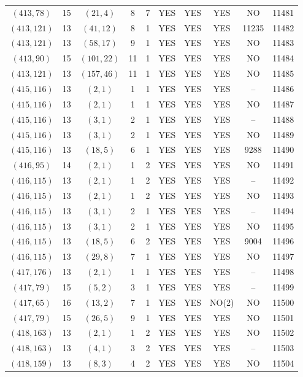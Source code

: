 \begin{longtable}{|c|c|c|c|c|c|c|c|c|c|}
$(413, 78)$ & 15 & $(21, 4)$ & 8 & 7 & YES & YES & YES & NO & 11481\\
$(413, 121)$ & 13 & $(41, 12)$ & 8 & 1 & YES & YES & YES & 11235 & 11482\\
$(413, 121)$ & 13 & $(58, 17)$ & 9 & 1 & YES & YES & YES & NO & 11483\\
$(413, 90)$ & 15 & $(101, 22)$ & 11 & 1 & YES & YES & YES & NO & 11484\\
$(413, 121)$ & 13 & $(157, 46)$ & 11 & 1 & YES & YES & YES & NO & 11485\\
$(415, 116)$ & 13 & $(2, 1)$ & 1 & 1 & YES & YES & YES & -- & 11486\\
$(415, 116)$ & 13 & $(2, 1)$ & 1 & 1 & YES & YES & YES & NO & 11487\\
$(415, 116)$ & 13 & $(3, 1)$ & 2 & 1 & YES & YES & YES & -- & 11488\\
$(415, 116)$ & 13 & $(3, 1)$ & 2 & 1 & YES & YES & YES & NO & 11489\\
$(415, 116)$ & 13 & $(18, 5)$ & 6 & 1 & YES & YES & YES & 9288 & 11490\\
$(416, 95)$ & 14 & $(2, 1)$ & 1 & 2 & YES & YES & YES & NO & 11491\\
$(416, 115)$ & 13 & $(2, 1)$ & 1 & 2 & YES & YES & YES & -- & 11492\\
$(416, 115)$ & 13 & $(2, 1)$ & 1 & 2 & YES & YES & YES & NO & 11493\\
$(416, 115)$ & 13 & $(3, 1)$ & 2 & 1 & YES & YES & YES & -- & 11494\\
$(416, 115)$ & 13 & $(3, 1)$ & 2 & 1 & YES & YES & YES & NO & 11495\\
$(416, 115)$ & 13 & $(18, 5)$ & 6 & 2 & YES & YES & YES & 9004 & 11496\\
$(416, 115)$ & 13 & $(29, 8)$ & 7 & 1 & YES & YES & YES & NO & 11497\\
$(417, 176)$ & 13 & $(2, 1)$ & 1 & 1 & YES & YES & YES & -- & 11498\\
$(417, 79)$ & 15 & $(5, 2)$ & 3 & 1 & YES & YES & YES & -- & 11499\\
$(417, 65)$ & 16 & $(13, 2)$ & 7 & 1 & YES & YES & NO(2) & NO & 11500\\
$(417, 79)$ & 15 & $(26, 5)$ & 9 & 1 & YES & YES & YES & NO & 11501\\
$(418, 163)$ & 13 & $(2, 1)$ & 1 & 2 & YES & YES & YES & NO & 11502\\
$(418, 163)$ & 13 & $(4, 1)$ & 3 & 2 & YES & YES & YES & -- & 11503\\
$(418, 159)$ & 13 & $(8, 3)$ & 4 & 2 & YES & YES & YES & NO & 11504\\

\end{longtable}

